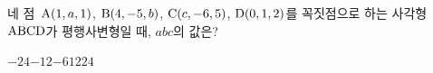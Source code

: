 네 점~$\mathrm{A}(1{,}\mkern3mu\mathopen{}a{,}\mkern3mu\mathopen{}1)$, $\mathrm{B}(4{,}\mkern3mu\mathopen{}-5{,}\mkern3mu\mathopen{}b)$, $\mathrm{C}(c{,}\mkern3mu\mathopen{}-6{,}\mkern3mu\mathopen{}5)$, $\mathrm{D}(0{,}\mkern3mu\mathopen{}1{,}\mkern3mu\mathopen{}2)$를 꼭짓점으로 하는 사각형~$\mathrm{ABCD}$가 평행사변형일 때, $abc$의 값은?
\begin{choices32}{$-24$}{$-12$}{$-6$}{$12$}{$24$}\end{choices32}
